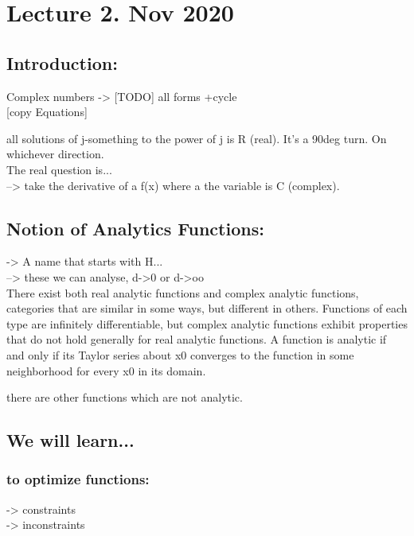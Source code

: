 
\section{Lecture 2. Nov 2020}

\subsection{Introduction:}

Complex numbers -> [TODO] all forms +cycle \\

[copy Equations]

all solutions of j-something to the power of j is R (real). It's a 90deg turn. On whichever direction. \\


The real question is...\\

--> take the derivative of a f(x) where a the variable is C (complex). 



\subsection{Notion of Analytics Functions:}


-> A name that starts with H...\\
--> these we can analyse, d->0 or d->oo\\


There exist both real analytic functions and complex analytic functions, categories that are similar in some ways, but different in others. Functions of each type are infinitely differentiable, but complex analytic functions exhibit properties that do not hold generally for real analytic functions. A function is analytic if and only if its Taylor series about x0 converges to the function in some neighborhood for every x0 in its domain.



there are other functions which are not analytic.



\subsection{We will learn...}

\subsubsection{to optimize functions:}
-> constraints\\
-> inconstraints\\

